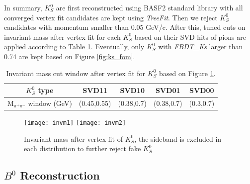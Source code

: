 In summary, $K_S^0$ are first reconstructed using BASF2 standard library with all converged vertex fit candidates are kept using \textit{TreeFit}. Then we reject $K_S^0$ candidates with momentum smaller than 0.05 GeV/c. After this, tuned cuts on invariant mass after vertex fit for each $K_S^0$ based on their SVD hits of pions are applied according to Table \ref{tab:ks_invm}. 
Eventually, only $K_S^0$ with \textit{FBDT\_Ks} larger than 0.74 are kept based on Figure \ref{fig:ks_fom}.
 
\begin{table}[h]
	\centering 
	\begin{tabular}{|c|c|c|c|c|} 
		\hline
		$K_S^0$ type & SVD11 & SVD10 & SVD01  & SVD00  \\
		\hline
		M$_{\pi^+\pi^-}$ window (GeV) & (0.45,0.55) & (0.38,0.7)  & (0.38,0.7)  & (0.3,0.7) \\
		\hline
	\end{tabular}
\caption{Invariant mass cut window after vertex fit for $K_S^0$ based on Figure \ref{fig:invm}.}
\label{tab:ks_invm}
\end{table}

\begin{figure}[htpb]
	\centering
	\texttt{[image: invm1]}
	\texttt{[image: invm2]}
	\caption{Invariant mass after vertex fit of $K_S^0$, the sideband is excluded in each distribution to further reject fake $K_S^0$}
	\label{fig:invm}
\end{figure}

\subsection{$B^0$  Reconstruction}

